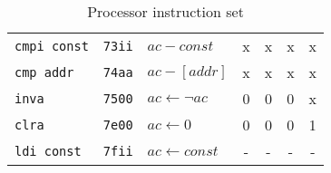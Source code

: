 \begin{table}[h]
\begin{tabu}[c]{|l|c|X|cccc|}
		\texttt{cmpi const} & \texttt{73ii} & $ac - const$ & x & x & x & x \\
		\texttt{cmp addr} & \texttt{74aa} & $ac - [addr]$ & x & x & x & x \\
		\texttt{inva} & \texttt{7500} & $ac \gets \neg ac$ & 0 & 0 & 0 & x \\
		\texttt{clra} & \texttt{7e00} & $ac \gets 0$ & 0 & 0 & 0 & 1 \\
		\texttt{ldi const} & \texttt{7fii} & $ac \gets const$ & - & - &- & - \\
		\bottomrule
	\end{tabu}
	\caption{Processor instruction set}
	\label{tb:iset}
\end{table}
